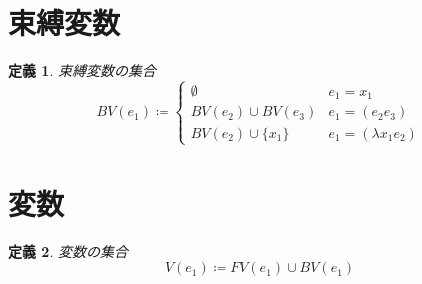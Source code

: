 \documentclass{ltjsbook}%
\newtheorem{definition}{定義}[section]%
\begin{document}
\section{束縛変数}%
\label{untyped:bv}%
\begin{definition}%
束縛変数の集合%
\begin{equation}%
  BV(\mathit{e}_1) \coloneqq \begin{cases}%
    \emptyset & \mathit{e}_1 = \mathit{x}_1\\%
    BV(\mathit{e}_2)\cup BV(\mathit{e}_3)%
    & \mathit{e}_1 = (\mathit{e}_2\mathit{e}_3)\\%
    BV(\mathit{e}_2)\cup\{\mathit{x}_1\}%
    & \mathit{e}_1 = (\lambda\mathit{x}_1\mathit{e}_2)%
  \end{cases}%
\end{equation}%
\end{definition}%
\section{変数}%
\label{untyped:v}%
\begin{definition}%
変数の集合%
\begin{equation}%
  V(\mathit{e}_1) \coloneqq FV(\mathit{e}_1)\cup BV(\mathit{e}_1)%
\end{equation}%
\end{definition}%
\end{document}
